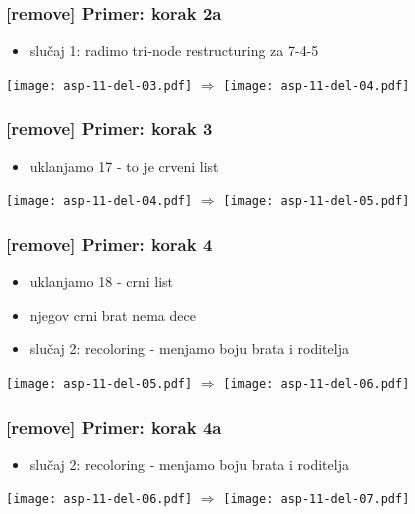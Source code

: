 \documentclass[compress,aspectratio=169]{beamer}
\begin{document}
\begin{frame}[fragile]
  \frametitle{[remove] Primer: korak 2a}
  \begin{itemize}
    \item slučaj 1: radimo tri-node restructuring za 7-4-5
  \end{itemize}
  \begin{center}
    \texttt{[image: asp-11-del-03.pdf]} $\Rightarrow$
    \texttt{[image: asp-11-del-04.pdf]}
  \end{center}
\end{frame}

\begin{frame}[fragile]
  \frametitle{[remove] Primer: korak 3}
  \begin{itemize}
    \item uklanjamo 17 - to je crveni list
  \end{itemize}
  \begin{center}
    \texttt{[image: asp-11-del-04.pdf]} $\Rightarrow$
    \texttt{[image: asp-11-del-05.pdf]}
  \end{center}
\end{frame}

\begin{frame}[fragile]
  \frametitle{[remove] Primer: korak 4}
  \begin{itemize}
    \item uklanjamo 18 - crni list
    \item njegov crni brat nema dece
    \item slučaj 2: recoloring - menjamo boju brata i roditelja
  \end{itemize}
  \begin{center}
    \texttt{[image: asp-11-del-05.pdf]} $\Rightarrow$
    \texttt{[image: asp-11-del-06.pdf]}
  \end{center}
\end{frame}

\begin{frame}[fragile]
  \frametitle{[remove] Primer: korak 4a}
  \begin{itemize}
    \item slučaj 2: recoloring - menjamo boju brata i roditelja
  \end{itemize}
  \begin{center}
    \texttt{[image: asp-11-del-06.pdf]} $\Rightarrow$
    \texttt{[image: asp-11-del-07.pdf]}
  \end{center}
\end{frame}
\end{document}
